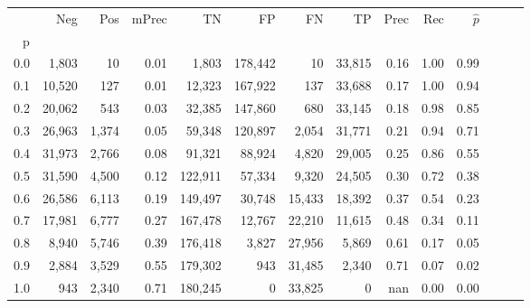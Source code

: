\begin{tabular}{rrrrrrrrrrrrrr}
\toprule
{} &     Neg &    Pos & mPrec &       TN &       FP &      FN &      TP &  Prec &   Rec & $\hat{p}$ \\
p   &         &        &       &          &          &         &         &       &       &           \\
\midrule
0.0 &   1,803 &     10 &  0.01 &    1,803 &  178,442 &      10 &  33,815 &  0.16 &  1.00 &      0.99 \\
0.1 &  10,520 &    127 &  0.01 &   12,323 &  167,922 &     137 &  33,688 &  0.17 &  1.00 &      0.94 \\
0.2 &  20,062 &    543 &  0.03 &   32,385 &  147,860 &     680 &  33,145 &  0.18 &  0.98 &      0.85 \\
0.3 &  26,963 &  1,374 &  0.05 &   59,348 &  120,897 &   2,054 &  31,771 &  0.21 &  0.94 &      0.71 \\
0.4 &  31,973 &  2,766 &  0.08 &   91,321 &   88,924 &   4,820 &  29,005 &  0.25 &  0.86 &      0.55 \\
0.5 &  31,590 &  4,500 &  0.12 &  122,911 &   57,334 &   9,320 &  24,505 &  0.30 &  0.72 &      0.38 \\
0.6 &  26,586 &  6,113 &  0.19 &  149,497 &   30,748 &  15,433 &  18,392 &  0.37 &  0.54 &      0.23 \\
0.7 &  17,981 &  6,777 &  0.27 &  167,478 &   12,767 &  22,210 &  11,615 &  0.48 &  0.34 &      0.11 \\
0.8 &   8,940 &  5,746 &  0.39 &  176,418 &    3,827 &  27,956 &   5,869 &  0.61 &  0.17 &      0.05 \\
0.9 &   2,884 &  3,529 &  0.55 &  179,302 &      943 &  31,485 &   2,340 &  0.71 &  0.07 &      0.02 \\
1.0 &     943 &  2,340 &  0.71 &  180,245 &        0 &  33,825 &       0 &   nan &  0.00 &      0.00 \\
\bottomrule
\end{tabular}
